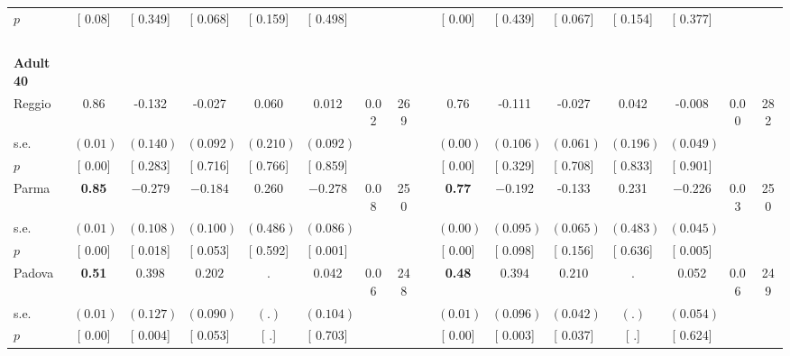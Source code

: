 \begin{longtable}{L{8em} c c c c c c c p{1em} c c c c c c c}
\quad \quad \quad \quad $ p$ & [     0.08] & [    0.349] & [    0.068] & [    0.159] & [    0.498] & & & & [     0.00] & [    0.439] & [    0.067] & [    0.154] & [    0.377] & &  \\[1em]
~\\[1em]
\quad \quad \textbf{Adult 40} & & & & & & & & & & & & & & & \\* 
\quad \quad \quad Reggio& 0.86 &    -0.132 &    -0.027 &     0.060 &     0.012 &      0.02 &       269 & & 0.76 &    -0.111 &    -0.027 &     0.042 &    -0.008 &      0.00 &       282  \\*
\quad \quad \quad \quad s.e.& $ (     0.01)$ & $ (    0.140)$ & $ (    0.092)$ & $ (    0.210)$ & $ (    0.092)$ & & & & $ (     0.00)$ & $ (    0.106)$ & $ (    0.061)$ & $ (    0.196)$ & $ (    0.049)$ & &  \\*
\quad \quad \quad \quad $ p$ & [     0.00] & [    0.283] & [    0.716] & [    0.766] & [    0.859] & & & & [     0.00] & [    0.329] & [    0.708] & [    0.833] & [    0.901] & &  \\[1em]
\quad \quad \quad Parma& \textbf{     0.85} & $ \mathbf{   -0.279}$ & $ \mathbf{   -0.184}$ &     0.260 & $ \mathbf{   -0.278}$ &      0.08 &       250 & & \textbf{     0.77} & $ \mathbf{   -0.192}$ &    -0.133 &     0.231 & $ \mathbf{   -0.226}$ &      0.03 &       250  \\*
\quad \quad \quad \quad s.e.& $ (     0.01)$ & $ (    0.108)$ & $ (    0.100)$ & $ (    0.486)$ & $ (    0.086)$ & & & & $ (     0.00)$ & $ (    0.095)$ & $ (    0.065)$ & $ (    0.483)$ & $ (    0.045)$ & &  \\*
\quad \quad \quad \quad $ p$ & [     0.00] & [    0.018] & [    0.053] & [    0.592] & [    0.001] & & & & [     0.00] & [    0.098] & [    0.156] & [    0.636] & [    0.005] & &  \\[1em]
\quad \quad \quad Padova& \textbf{     0.51} & $ \mathbf{    0.398}$ & $ \mathbf{    0.202}$ &         . &     0.042 &      0.06 &       248 & & \textbf{     0.48} & $ \mathbf{    0.394}$ & $ \mathbf{    0.210}$ &         . &     0.052 &      0.06 &       249  \\*
\quad \quad \quad \quad s.e.& $ (     0.01)$ & $ (    0.127)$ & $ (    0.090)$ & $ (        .)$ & $ (    0.104)$ & & & & $ (     0.01)$ & $ (    0.096)$ & $ (    0.042)$ & $ (        .)$ & $ (    0.054)$ & &  \\*
\quad \quad \quad \quad $ p$ & [     0.00] & [    0.004] & [    0.053] & [        .] & [    0.703] & & & & [     0.00] & [    0.003] & [    0.037] & [        .] & [    0.624] & &  \\[1em]

\end{longtable}
